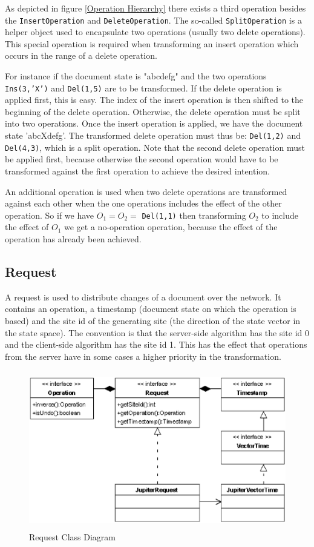 \label{Split_Operation}
As depicted in figure \ref{Operation Hierarchy} there exists a third operation besides the \texttt{InsertOperation} and \texttt{DeleteOperation}. The so-called \texttt{SplitOperation} is a helper object used to encapsulate two operations (usually two delete operations). This special operation is required when transforming an insert operation which occurs in the range of a delete operation. 

For instance if the document state is "abcdefg" and the two operations
\texttt{Ins(3,'X')} and \texttt{Del(1,5)} are to be transformed. If
the delete operation is applied first, this is easy. The index of the insert
operation is then shifted to the beginning of the delete operation. Otherwise,
the delete operation must be split into two operations. Once the insert
operation is applied, we have the document state 'abcXdefg'. The transformed
delete operation must thus be: \texttt{Del(1,2)} and \texttt{Del(4,3)},
which is a split operation. Note that the second delete operation must be
applied first, because otherwise the second operation would have to be
transformed against the first operation to achieve the desired intention.

An additional operation is used when two delete operations are transformed
against each other when the one operations includes the effect of the other
operation. So if we have $O_1 = O_2 = $ \texttt{Del(1,1)} then transforming
$O_2$ to include the effect of $O_1$ we get a no-operation operation, because
the effect of the operation has already been achieved.


\subsection{Request}
A request is used to distribute changes of a document over the network. It 
contains an operation, a timestamp (document 
state on which the operation is based) and the site id of the generating site
(the direction of the state vector in the state space). The convention is
that the server-side algorithm has the site id 0 and the client-side
algorithm has the site id 1. This has the effect that operations
from the server have in some cases a higher priority in the transformation.

\begin{figure}[H]
\centering
\includegraphics[height=6.87cm,width=12.09cm]{../images/finalreport/algorithm_request.eps}
\caption{Request Class Diagram}
\label{Request Class Diagram}
\end{figure}


